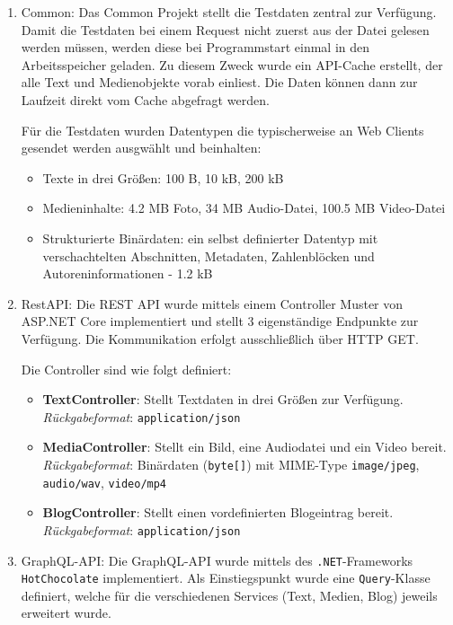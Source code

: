 \begin{enumerate}
	\item Common:
	Das Common Projekt stellt die Testdaten zentral zur Verfügung. Damit die Testdaten bei einem Request nicht zuerst aus der Datei gelesen werden müssen, werden diese bei Programmstart einmal in den Arbeitsspeicher geladen. Zu diesem Zweck wurde ein API-Cache erstellt, der alle Text und Medienobjekte vorab einliest. Die Daten können dann zur Laufzeit direkt vom Cache abgefragt werden.
	
	Für die Testdaten wurden Datentypen die typischerweise an Web Clients gesendet werden ausgwählt und beinhalten:
	
	
	\begin{itemize}
		\item Texte in drei Größen: 100 B, 10 kB, 200 kB
		\item Medieninhalte: 4.2 MB Foto, 34 MB Audio-Datei, 100.5 MB Video-Datei
		\item Strukturierte Binärdaten: ein selbst definierter Datentyp mit verschachtelten Abschnitten, Metadaten, Zahlenblöcken und Autoreninformationen - 1.2 kB
	\end{itemize}
	\item RestAPI:
	Die REST API wurde mittels einem Controller Muster von ASP.NET Core implementiert und stellt 3 eigenständige Endpunkte zur Verfügung. Die Kommunikation erfolgt ausschließlich über HTTP GET.
	
	Die Controller sind wie folgt definiert:
	
	\begin{itemize}
		\item \textbf{TextController}: Stellt Textdaten in drei Größen zur Verfügung.\\
		\emph{Rückgabeformat}: \texttt{application/json}
		\item \textbf{MediaController}: Stellt ein Bild, eine Audiodatei und ein Video bereit.\\
		\emph{Rückgabeformat}: Binärdaten (\texttt{byte[]}) mit MIME-Type \texttt{image/jpeg}, \texttt{audio/wav}, \texttt{video/mp4}
		\item \textbf{BlogController}: Stellt einen vordefinierten Blogeintrag bereit.\\
		\emph{Rückgabeformat}: \texttt{application/json}
	\end{itemize}
	
	\item GraphQL-API:
	Die GraphQL-API wurde mittels des \texttt{.NET}-Frameworks \texttt{HotChocolate} implementiert.
	Als Einstiegspunkt wurde eine \texttt{Query}-Klasse definiert, welche für die verschiedenen Services (Text, Medien, Blog) jeweils erweitert wurde.
	

\end{enumerate}
